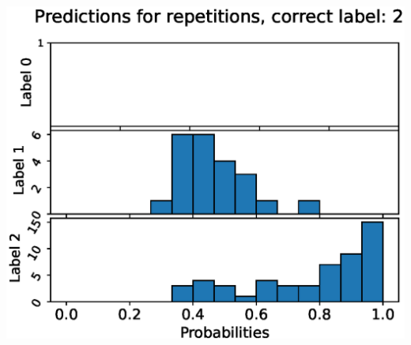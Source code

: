 \begin{center}
\begin{minipage}{0.33\textwidth}
  \includegraphics[width=\textwidth]{files/figs/app/hists/femval/pr2.eps}
\end{minipage}


\end{center}
